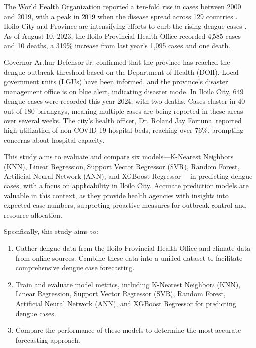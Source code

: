 \documentclass{article}
\begin{document}
The World Health Organization reported a ten-fold rise in cases between 2000 and 2019, with a peak in 2019 when the disease spread across 129 countries \cite{WHO2024}. Iloilo City and Province are intensifying efforts to curb the rising dengue cases \cite{lena2024}. As of August 10, 2023, the Iloilo Provincial Health Office recorded 4,585 cases and 10 deaths, a 319\% increase from last year’s 1,095 cases and one death. 

Governor Arthur Defensor Jr. confirmed that the province has reached the dengue outbreak threshold based on the Department of Health (DOH). Local government units (LGUs) have been informed, and the province’s disaster management office is on blue alert, indicating disaster mode. \cite{PNA2024} In Iloilo City, 649 dengue cases were recorded this year 2024, with two deaths. Cases cluster in 40 out of 180 barangays, meaning multiple cases are being reported in these areas over several weeks. The city’s health officer, Dr. Roland Jay Fortuna, reported high utilization of non-COVID-19 hospital beds, reaching over 76\%, prompting concerns about hospital capacity. 

This study aims to evaluate and compare six models—K-Nearest Neighbors (KNN), Linear Regression, Support Vector Regressor (SVR), Random Forest, Artificial Neural Network (ANN), and XGBoost Regressor  —in predicting dengue cases, with a focus on applicability in Iloilo City. Accurate prediction models are valuable in this context, as they provide health agencies with insights into expected case numbers, supporting proactive measures for outbreak control and resource allocation.

Specifically, this study aims to:
\begin{enumerate}
    \item Gather dengue data from the Iloilo Provincial Health Office and climate data from online sources. Combine these data into a unified dataset to facilitate comprehensive dengue case forecasting.
    \item Train and evaluate model metrics, including K-Nearest Neighbors (KNN), Linear Regression, Support Vector Regressor (SVR), Random Forest, Artificial Neural Network (ANN), and XGBoost Regressor for predicting dengue cases.
    \item Compare the performance of these models to determine the most accurate forecasting approach.
\end{enumerate}
\end{document}
